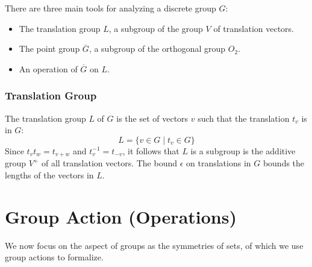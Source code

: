 \documentclass[letterpaper]{article}
\begin{document}
\bigskip

There are three main tools for analyzing a discrete group $G$: 
\begin{itemize}
    \item The translation group $L$, a subgroup of the group $V$ of translation vectors. 
    \item The point group $\overline{G}$, a subgroup of the orthogonal group $O_2$. 
    \item An operation of $\overline{G}$ on $L$. 
\end{itemize}

\subsubsection{Translation Group}
The translation group $L$ of $G$ is the set of vectors $v$ such that the translation $t_v$ is in $G$: 
\[L = \{v \in G \mid t_v \in G\}\]
Since $t_v t_w = t_{v + w}$ and $t_{v}^{-1} = t_{-v}$, it follows that $L$ is a subgroup is the additive group $V^+$ of all translation vectors. The bound $\epsilon$ on translations in $G$ bounds the lengths of the vectors in $L$. 












\newpage
\section{Group Action (Operations)}
We now focus on the aspect of groups as the symmetries of sets, of which we use group actions to formalize. 
\end{document}
